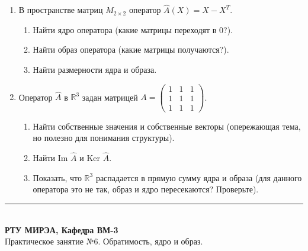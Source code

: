 \documentclass[12pt,a4paper]{article}
\theoremstyle{plain}
\theoremstyle{definition}
\begin{document}
\begin{enumerate}[leftmargin=*, label=\arabic*.]
    \item[*] В пространстве матриц $M_{2\times2}$ оператор $\hat{A}(X) = X - X^T$.
    \begin{enumerate}
        \item Найти ядро оператора (какие матрицы переходят в 0?).
        \item Найти образ оператора (какие матрицы получаются?).
        \item Найти размерности ядра и образа.
    \end{enumerate}

    \item[*] Оператор $\hat{A}$ в $\mathbb{R}^3$ задан матрицей $A = \begin{pmatrix} 1 & 1 & 1 \\ 1 & 1 & 1 \\ 1 & 1 & 1 \end{pmatrix}$.
    \begin{enumerate}
        \item Найти собственные значения и собственные векторы (опережающая тема, но полезно для понимания структуры).
        \item Найти $\text{Im } \hat{A}$ и $\text{Ker } \hat{A}$.
        \item Показать, что $\mathbb{R}^3$ распадается в прямую сумму ядра и образа (для данного оператора это не так, образ и ядро пересекаются? Проверьте).
    \end{enumerate}
\end{enumerate}

\vspace{0.5cm}
\begin{center}
    \textcolor{mireaMain}{\rule{0.6\textwidth}{1pt}} \\
    \small \textbf{РТУ МИРЭА, Кафедра ВМ-3} \\
    \small Практическое занятие №6. Обратимость, ядро и образ.
\end{center}
\end{document}
